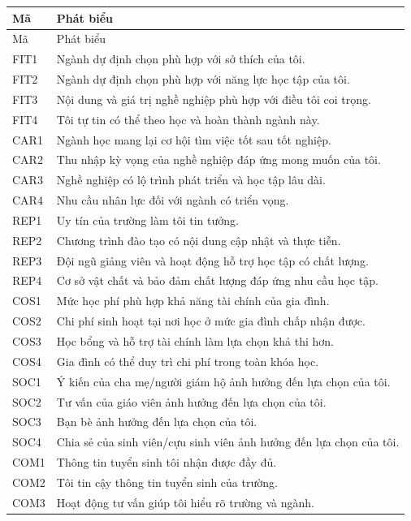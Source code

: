 \begin{longtable}{p{1.3cm}p{11.3cm}}\toprule Mã & Phát biểu\\\midrule\endfirsthead\toprule Mã & Phát biểu\\\midrule\endhead
FIT1 & Ngành dự định chọn phù hợp với sở thích của tôi.\\
FIT2 & Ngành dự định chọn phù hợp với năng lực học tập của tôi.\\
FIT3 & Nội dung và giá trị nghề nghiệp phù hợp với điều tôi coi trọng.\\
FIT4 & Tôi tự tin có thể theo học và hoàn thành ngành này.\\
CAR1 & Ngành học mang lại cơ hội tìm việc tốt sau tốt nghiệp.\\
CAR2 & Thu nhập kỳ vọng của nghề nghiệp đáp ứng mong muốn của tôi.\\
CAR3 & Nghề nghiệp có lộ trình phát triển và học tập lâu dài.\\
CAR4 & Nhu cầu nhân lực đối với ngành có triển vọng.\\
REP1 & Uy tín của trường làm tôi tin tưởng.\\
REP2 & Chương trình đào tạo có nội dung cập nhật và thực tiễn.\\
REP3 & Đội ngũ giảng viên và hoạt động hỗ trợ học tập có chất lượng.\\
REP4 & Cơ sở vật chất và bảo đảm chất lượng đáp ứng nhu cầu học tập.\\
COS1 & Mức học phí phù hợp khả năng tài chính của gia đình.\\
COS2 & Chi phí sinh hoạt tại nơi học ở mức gia đình chấp nhận được.\\
COS3 & Học bổng và hỗ trợ tài chính làm lựa chọn khả thi hơn.\\
COS4 & Gia đình có thể duy trì chi phí trong toàn khóa học.\\
SOC1 & Ý kiến của cha mẹ/người giám hộ ảnh hưởng đến lựa chọn của tôi.\\
SOC2 & Tư vấn của giáo viên ảnh hưởng đến lựa chọn của tôi.\\
SOC3 & Bạn bè ảnh hưởng đến lựa chọn của tôi.\\
SOC4 & Chia sẻ của sinh viên/cựu sinh viên ảnh hưởng đến lựa chọn của tôi.\\
COM1 & Thông tin tuyển sinh tôi nhận được đầy đủ.\\
COM2 & Tôi tin cậy thông tin tuyển sinh của trường.\\
COM3 & Hoạt động tư vấn giúp tôi hiểu rõ trường và ngành.\\

\end{longtable}
